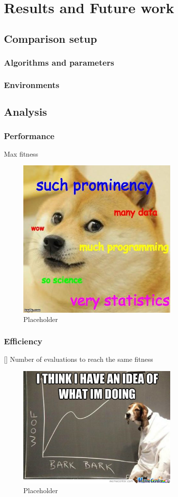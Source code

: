 \chapter{Results and Future work}
\label{chap:results}

\section{Comparison setup}
\subsection{Algorithms and parameters}

\subsection{Environments}

\section{Analysis}

\subsection{Performance}
Max fitness
\begin{figure}[H]
\centering
\includegraphics[width=8cm]{images/data_meme.jpg}
\caption{Placeholder}
\end{figure}
      
      
\subsection{Efficiency}[]
Number of evaluations to reach the same fitness
\begin{figure}[H]
\centering
\includegraphics[width=8cm]{images/data_meme2.jpg}
\caption{Placeholder}
\end{figure}

